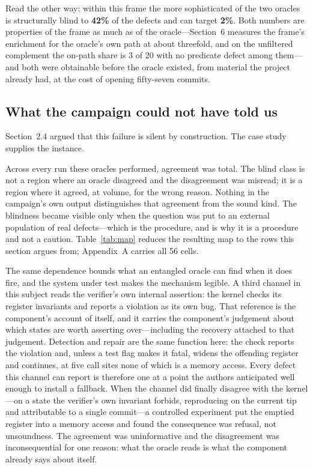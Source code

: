 Read the other way: within this frame the more sophisticated of the two oracles is
structurally blind to \textbf{42\%} of the defects and can target \textbf{2\%}. Both
numbers are properties of the frame as much as of the oracle---Section~6 measures the
frame's enrichment for the oracle's own path at about threefold, and on the
unfiltered complement the on-path share is 3 of 20 with no predicate defect among
them---and both were obtainable before the oracle existed, from material the project
already had, at the cost of opening fifty-seven commits.

\subsection{What the campaign could not have told us}

Section~2.4 argued that this failure is silent by construction. The case study
supplies the instance.

Across every run these oracles performed, agreement was total. The blind class is
not a region where an oracle disagreed and the disagreement was misread; it is a
region where it agreed, at volume, for the wrong reason. Nothing in the campaign's
own output distinguishes that agreement from the sound kind. The blindness became
visible only when the question was put to an external population of real
defects---which is the procedure, and is why it is a procedure and not a caution.
Table~\ref{tab:map} reduces the resulting map to the rows this section argues from;
Appendix~A carries all 56 cells.

The same dependence bounds what an entangled oracle can find when it does fire, and
the system under test makes the mechanism legible. A third channel in this subject
reads the verifier's own internal assertion: the kernel checks its register
invariants and reports a violation as its own bug. That reference is the component's
account of itself, and it carries the component's judgement about which states are
worth asserting over---including the recovery attached to that judgement. Detection
and repair are the same function here: the check reports the violation and, unless a
test flag makes it fatal, widens the offending register and continues, at five call
sites none of which is a memory access. Every defect this channel can report is
therefore one at a point the authors anticipated well enough to install a fallback.
When the channel did finally disagree with the kernel---on a state the verifier's own
invariant forbids, reproducing on the current tip and attributable to a single
commit---a controlled experiment put the emptied register into a memory access and
found the consequence was refusal, not unsoundness. The agreement was uninformative
and the disagreement was inconsequential for one reason: what the oracle reads is
what the component already says about itself.

